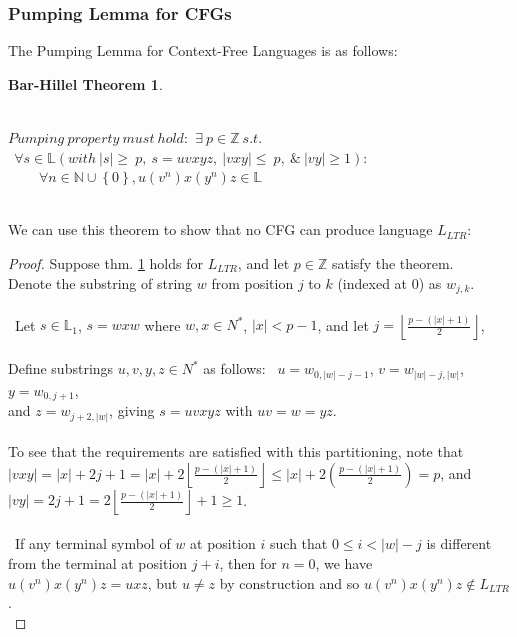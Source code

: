 \documentclass[11pt]{article}
\begin{document}
\subsubsection {Pumping Lemma for CFGs}
The Pumping Lemma for Context-Free Languages is as follows:
\newtheorem{thm:bar-hillel}{Bar-Hillel Theorem}
\begin{thm:bar-hillel} \label{thm:bar-hillel}
\begin{algorithmic}
\ \\
  \STATE $Pumping \ property \ must \ hold:$
  \STATE $\exists \ p \in \mathds{Z} \ s.t.$
  \STATE $\ \ \forall s \in \mathds{L} \left (with \ \left | s \right | \geq \ p, \ s = uvxyz, \ \left | vxy \right | \leq \ p, \ \& \ \left | vy \right | \geq 1 \right ): $
  \STATE $\ \  \ \ \ \ \ \ \ \ \forall n \in \mathds{N} \cup \left \{ 0 \right \}, u(v^n)x(y^n)z \in \mathds{L}$
\ENDIF
\end{algorithmic}
\end{thm:bar-hillel}

\ \\
We can use this theorem to show that no CFG can produce language $L_{LTR}$:\\
\begin{proof}
Suppose thm. \ref{thm:bar-hillel} holds for $L_{LTR}$,
and let $p \in \mathds{Z}$ satisfy the theorem. \\
Denote the substring of string $w$ from position $j$ to $k$ (indexed at 0) as $w_{j,k}$.\\ \\
\
Let $s \in \mathds{L}_1$, $s = wxw$ where $w, x \in N^*$, $|x| < p - 1$,
and let $j = \left \lfloor  \frac{p - (|x| + 1)}{2} \right \rfloor$,\\ \\
Define substrings $u, v, y, z \in N^*$ as follows: \ 
$u = w_{0, |w| - j - 1}$,
$v = w_{|w|-j, |w|}$,
$y = w_{0, j+1}$, \\ and
$z = w_{j+2, |w|}$, giving
$s = uvxyz$ with $uv = w = yz$.\\ \\
To see that the requirements are satisfied with this partitioning, note that
$|vxy| = |x| + 2j + 1 = |x| + 2\left \lfloor \frac{p - (|x| + 1)}{2} \right \rfloor 
\leq |x| + 2\left (  \frac{p - (|x|+1)}{2} \right ) = p$,
and $|vy| = 2j + 1 = 2\left \lfloor \frac{p - (|x| + 1)}{2} \right \rfloor + 1 \geq 1$.\\ \\
\
If any terminal symbol of $w$ at position $i$ such that $0 \leq i < |w| - j$ is different from the terminal at position $j+i$,
then for $n = 0$, we have $u(v^n)x(y^n)z = uxz$, but $u \neq z$ by construction and so $u(v^n)x(y^n)z \notin L_{LTR}$.\\
\end{proof}
\end{document}
